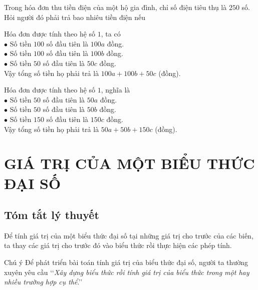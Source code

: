 \begin{bt}%
Trong hóa đơn thu tiền điện của một hộ gia đình, chỉ số điện tiêu thụ là $250$ số. Hỏi người đó phải trả bao nhiêu tiền điện nếu
\begin{enumEX}{1}
	\item Hóa đơn được tính theo hệ số $1$, ta có\\
	$\bullet$ Số tiền $100$ số đầu tiên là $100a$ đồng.\\
	$\bullet$ Số tiền $100$ số đầu tiên là $100b$ đồng.\\
	$\bullet$ Số tiền $50$ số đầu tiên là $50c$ đồng.\\
	Vậy tổng số tiền họ phải trả là $100a+100b+50c$ (đồng).
	\item Hóa đơn được tính theo hệ số $1$, nghĩa là\\
	$\bullet$ Số tiền $50$ số đầu tiên là $50a$ đồng.\\
	$\bullet$ Số tiền $50$ số đầu tiên là $50b$ đồng.\\
	$\bullet$ Số tiền $150$ số đầu tiên là $150c$ đồng.\\
	Vậy tổng số tiền họ phải trả là $50a+50b+150c$ (đồng).
\end{enumEX}
\end{bt}

\section{GIÁ TRỊ CỦA MỘT BIỂU THỨC ĐẠI SỐ}
\subsection{Tóm tắt lý thuyết}
Để tính giá trị của một biểu thức đại số tại những giá trị cho trước của các biến, ta thay các giá trị cho trước đó vào biểu thức rồi thực hiện các phép tính.
\begin{note}{Chú ý}
	Để phát triển bài toán tính giá trị của biểu thức đại số, người ta thường xuyên yêu cầu \lq\lq\textit{Xây dựng biểu thức rồi tính giá trị của biểu thức trong một hay nhiều trường hợp cụ thể}.\rq\rq
\end{note}

